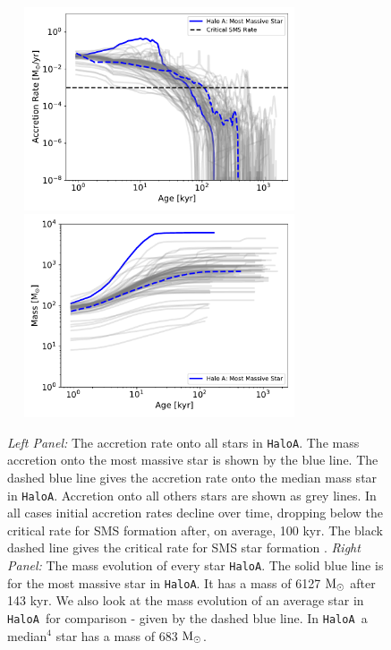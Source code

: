 \documentclass[twocolumn,iop,revtex4]{openjournal}
\newcommand{\msolar} {$\rm{M_{\odot}}~$}
\newcommand{\msolarc} {$\rm{M_{\odot}}$}
\newcommand{\ha} {\texttt{HaloA~}}
\newcommand{\hac} {\texttt{HaloA}}
\begin{document}



\begin{figure}
\centering
\begin{minipage}{175mm}      \begin{center}
    \centerline{
      \includegraphics[width=9.0cm, height=6cm]{FIGURES/AccretionRate_HaloA.pdf}
      \includegraphics[width=9.0cm, height=6cm]{FIGURES/Mass_HaloA.pdf}}
    \caption{
      \textit{Left Panel:} The accretion rate onto all stars in \hac. The mass accretion onto the
      most massive star is shown by the blue line. The dashed blue line gives the accretion
      rate onto the median mass star in \hac. Accretion onto all others stars are shown as grey lines.
      In all cases initial accretion rates decline over time, dropping below the critical rate
      for SMS formation after, on average, 100 kyr. The black dashed line gives the critical rate for SMS
      star formation \citep{Haemmerle_2017}.
      \textit{Right Panel:}  The mass evolution of every star \hac. The
      solid blue line is for the most massive star in \hac. It has a mass of
      6127 \msolar after 143 kyr. We also look at the mass evolution
      of an average star in \ha for comparison - given by the dashed blue line.
      In \ha a median$^4$ star has a mass of 683 \msolarc.
    }
\label{Fig:HaloA_AccretionRates}
\end{center} \end{minipage}
\end{figure}
\end{document}
